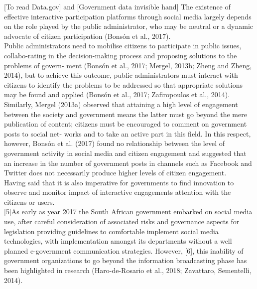 [To read Data.gov] and [Government data invisible hand]
The existence of effective interactive participation platforms through social media largely depends on the role played by the public administrator, who may be neutral or a dynamic advocate of citizen participation (Bonsón et al., 2017).\\ 
Public administrators need to mobilise citizens to participate in public issues, collabo-rating in the decision-making process and proposing solutions to the problems of govern- ment (Bonsón et al., 2017; Mergel, 2013b; Zheng and Zheng, 2014), but to achieve this outcome, public administrators must interact with citizens to identify the problems to be addressed so that appropriate solutions may be found and applied (Bonsón et al., 2017; Zafiropoulos et al., 2014).\\
Similarly, Mergel (2013a) observed that attaining a high level of engagement between the society and government means the latter must go beyond the mere publication of content; citizens must be encouraged to comment on government posts to social net- works and to take an active part in this field. In this respect, however, Bonsón et al. (2017) found no relationship between the level of government activity in social media and citizen engagement and suggested that an increase in the number of government posts in channels such as Facebook and Twitter does not necessarily produce higher levels of citizen engagement.\\

Having said that it is also imperative for governments to find innovation to observe and monitor impact of interactive engagements attention with the citizens or users. \\ 

[5]As early as year 2017 the South African government embarked on social media use, after careful consideration of associated risks and governance aspects for legislation providing guidelines to comfortable implement social media technologies, with implementation amongst its departments without a well planned e-government communication strategies. However, [6], this inability of government organizations to go beyond the information broadcasting phase has been highlighted in research (Haro-de-Rosario et al., 2018; Zavattaro, Sementelli, 2014).\\

